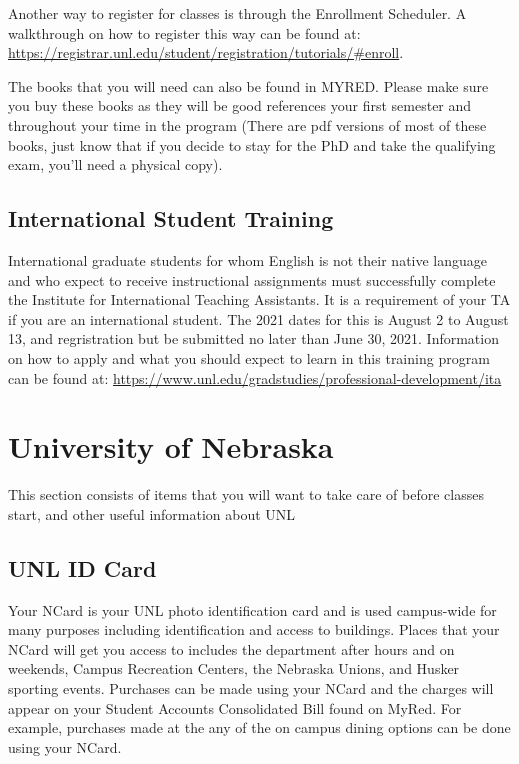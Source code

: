 \documentclass[
  12pt,
]{book}
\begin{document}
Another way to register for classes is through the Enrollment Scheduler. A walkthrough on how to register this way can be found at: \url{https://registrar.unl.edu/student/registration/tutorials/\#enroll}.

The books that you will need can also be found in MYRED. Please make sure you buy these books as they will be good references your first semester and throughout your time in the program (There are pdf versions of most of these books, just know that if you decide to stay for the PhD and take the qualifying exam, you'll need a physical copy).

\hypertarget{international-student-training}{%
\section{International Student Training}\label{international-student-training}}

International graduate students for whom English is not their native language and who expect to receive instructional assignments must successfully complete the Institute for International Teaching Assistants. It is a requirement of your TA if you are an international student. The 2021 dates for this is August 2 to August 13, and regristration but be submitted no later than June 30, 2021. Information on how to apply and what you should expect to learn in this training program can be found at: \url{https://www.unl.edu/gradstudies/professional-development/ita}

\hypertarget{unl}{%
\chapter{University of Nebraska}\label{unl}}

This section consists of items that you will want to take care of before classes start, and other useful information about UNL

\hypertarget{unl-id-card}{%
\section{UNL ID Card}\label{unl-id-card}}

Your NCard is your UNL photo identification card and is used campus-wide for many purposes including identification and access to buildings. Places that your NCard will get you access to includes the department after hours and on weekends, Campus Recreation Centers, the Nebraska Unions, and Husker sporting events. Purchases can be made using your NCard and the charges will appear on your Student Accounts Consolidated Bill found on MyRed. For example, purchases made at the any of the on campus dining options can be done using your NCard.
\end{document}
